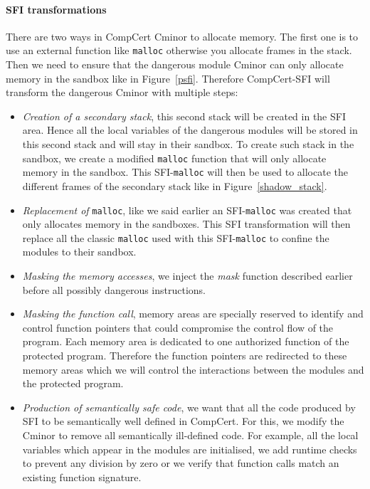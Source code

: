 \documentclass[11pt]{sdm}
\begin{document}
\paragraph{SFI transformations}
\label{par:SFI transformations}
There are two ways in CompCert Cminor to allocate memory. The first one is to use an external function like \texttt{malloc} otherwise you allocate frames in the stack. Then we need to ensure that the dangerous module Cminor can only allocate memory in the sandbox like in Figure~\ref{psfi}. Therefore CompCert-SFI will transform the dangerous Cminor with multiple steps:
\begin{itemize}
	\item \textit{Creation of a secondary stack}, this second stack will be created in the SFI area. Hence all the local variables of the dangerous modules will be stored in this second stack and will stay in their sandbox. To create such stack in the sandbox, we create a modified \texttt{malloc} function that will only allocate memory in the sandbox. This SFI-\texttt{malloc} will then be used to allocate the different frames of the secondary stack like in Figure~\ref{shadow_stack}. 
	\item \textit{Replacement of} \texttt{malloc}, like we said earlier an SFI-\texttt{malloc} was created that only allocates memory in the sandboxes. This SFI transformation will then replace all the classic \texttt{malloc} used with this SFI-\texttt{malloc} to confine the modules to their sandbox.
	\item \textit{Masking the memory accesses}, we inject the \textit{mask} function described earlier before all possibly dangerous instructions.
	\item \textit{Masking the function call}, memory areas are specially reserved to identify and control function pointers that could compromise the control flow of the program. Each memory area is dedicated to one authorized function of the protected program. Therefore the function pointers are redirected to these memory areas which we will control the interactions between the modules and the protected program.
	\item \textit{Production of semantically safe code}, we want that all the code produced by SFI to be semantically well defined in CompCert. For this, we modify the Cminor to remove all semantically ill-defined code. For example, all the local variables which appear in the modules are initialised, we add runtime checks to prevent any division by zero or we verify that function calls match an existing function signature.
\end{itemize}
\end{document}
